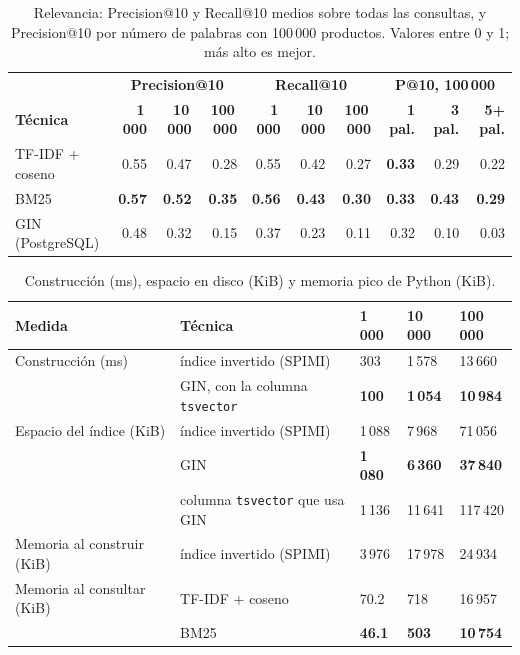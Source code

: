 
\begin{table}[!htb]
\centering
\caption{Relevancia: Precision@10 y Recall@10 medios sobre todas las consultas, y
Precision@10 por número de palabras con 100\,000 productos. Valores entre 0 y 1; más alto
es mejor.}\label{tab:texto-relevancia}
\small
\begin{tabular}{@{}lrrrrrrrrr@{}}
\toprule
 & \multicolumn{3}{c}{\textbf{Precision@10}} & \multicolumn{3}{c}{\textbf{Recall@10}} & \multicolumn{3}{c}{\textbf{P@10, 100\,000}} \\
\cmidrule(lr){2-4}\cmidrule(lr){5-7}\cmidrule(l){8-10}
\textbf{Técnica} & \textbf{1\,000} & \textbf{10\,000} & \textbf{100\,000} & \textbf{1\,000} & \textbf{10\,000} & \textbf{100\,000} & \textbf{1 pal.} & \textbf{3 pal.} & \textbf{5+ pal.} \\
\midrule
TF-IDF + coseno & 0.55 & 0.47 & 0.28 & 0.55 & 0.42 & 0.27 & \textbf{0.33} & 0.29 & 0.22 \\
BM25 & \textbf{0.57} & \textbf{0.52} & \textbf{0.35} & \textbf{0.56} & \textbf{0.43} & \textbf{0.30} & \textbf{0.33} & \textbf{0.43} & \textbf{0.29} \\
GIN (PostgreSQL) & 0.48 & 0.32 & 0.15 & 0.37 & 0.23 & 0.11 & 0.32 & 0.10 & 0.03 \\
\bottomrule
\end{tabular}
\end{table}

\begin{table}[!htb]
\centering
\caption{Construcción (ms), espacio en disco (KiB) y memoria pico de Python (KiB).}\label{tab:texto-indice}
\small
\begin{tabular}{@{}llR{1.5cm}R{1.5cm}R{1.5cm}@{}}
\toprule
\textbf{Medida} & \textbf{Técnica} & \textbf{1\,000} & \textbf{10\,000} & \textbf{100\,000} \\
\midrule
Construcción (ms) & índice invertido (SPIMI) & 303 & 1\,578 & 13\,660 \\
 & GIN, con la columna \texttt{tsvector} & \textbf{100} & \textbf{1\,054} & \textbf{10\,984} \\
Espacio del índice (KiB) & índice invertido (SPIMI) & 1\,088 & 7\,968 & 71\,056 \\
 & GIN & \textbf{1\,080} & \textbf{6\,360} & \textbf{37\,840} \\
 & columna \texttt{tsvector} que usa GIN & 1\,136 & 11\,641 & 117\,420 \\
Memoria al construir (KiB) & índice invertido (SPIMI) & 3\,976 & 17\,978 & 24\,934 \\
Memoria al consultar (KiB) & TF-IDF + coseno & 70.2 & 718 & 16\,957 \\
 & BM25 & \textbf{46.1} & \textbf{503} & \textbf{10\,754} \\
\bottomrule
\end{tabular}
\end{table}

